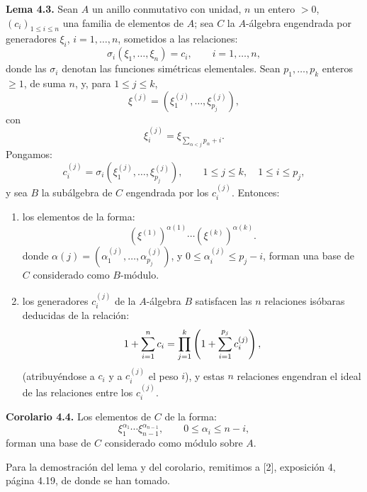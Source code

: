 \textbf{Lema 4.3.} Sean \(A\) un anillo conmutativo con unidad, \(n\) un entero \(>0\), \((c_i)_{1\le i\le n}\) una familia de elementos de \(A\); sea \(C\) la \(A\)-álgebra engendrada por generadores \(\xi_i\), \(i=1,\ldots,n\), sometidos a las relaciones:
\[
  \sigma_i(\xi_1,\ldots,\xi_n)=c_i,
  \qquad i=1,\ldots,n,
\]
donde las \(\sigma_i\) denotan las funciones simétricas elementales. Sean \(p_1,\ldots,p_k\) enteros \(\geq1\), de suma \(n\), y, para \(1\le j\le k\),
\[
  \xi^{(j)}=(\xi_1^{(j)},\ldots,\xi_{p_j}^{(j)}),
\]
con
\[
  \xi_i^{(j)}=\xi_{\sum_{\alpha<j}p_\alpha+i}.
\]
Pongamos:
\[
  c_i^{(j)}=\sigma_i(\xi_1^{(j)},\ldots,\xi_{p_j}^{(j)}),
  \qquad 1\le j\le k,
  \quad 1\le i\le p_j,
\]
y sea \(B\) la subálgebra de \(C\) engendrada por los \(c_i^{(j)}\). Entonces:
\begin{enumerate}[label=\textup{\roman*)}]
\item los elementos de la forma:
\[
  (\xi^{(1)})^{\alpha(1)}\cdots (\xi^{(k)})^{\alpha(k)}.
\]
donde \(\alpha(j)=(\alpha_1^{(j)},\ldots,\alpha_{p_j}^{(j)})\), y \(0\le \alpha_i^{(j)}\le p_j-i\), forman una base de \(C\) considerado como \(B\)-módulo.
\item los generadores \(c_i^{(j)}\) de la \(A\)-álgebra \(B\) satisfacen las \(n\) relaciones isóbaras deducidas de la relación:
\[
  \sisi{\sum_{i=1}^{n}c_i=\prod_{j=1}^{k}\left(\sum_{i=1}^{p_j}c_i^{(j)}\right)}{1+\sum_{i=1}^{n}c_i=\prod_{j=1}^{k}\left(1+\sum_{i=1}^{p_j}c_i^{(j)}\right)}, %
\]
(atribuyéndose a \(c_i\) y a \(c_i^{(j)}\) el peso \(i\)), y estas \(n\) relaciones engendran el ideal de las relaciones entre los \(c_i^{(j)}\).
\end{enumerate}

\textbf{Corolario 4.4.} Los elementos de \(C\) de la forma:
\[
  \xi_1^{\alpha_1}\cdots\xi_{n-1}^{\alpha_{n-1}},
  \qquad 0\le\alpha_i\le n-i,
\]
forman una base de \(C\) considerado como módulo sobre \(A\).

Para la demostración del lema y del corolario, remitimos a [2], exposición 4, página 4.19, de donde se han tomado.
